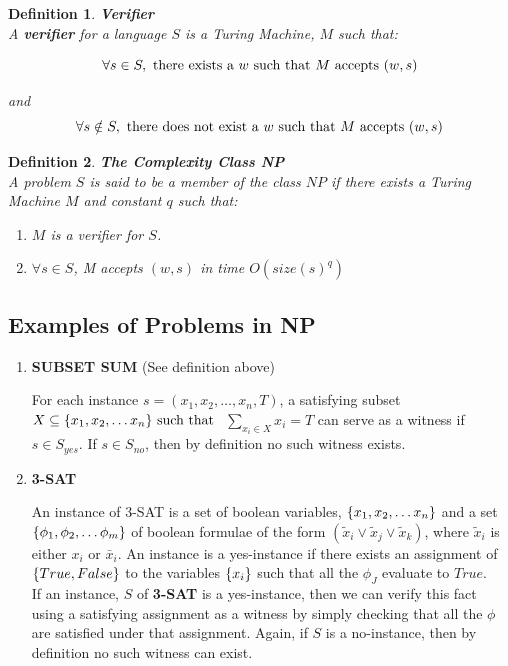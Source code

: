 \documentclass{article}
\newtheorem{definition}{Definition}[section]
\renewcommand{\suchthat}[0]{\textnormal{ such that }}
\begin{document}
\begin{definition}{\textbf{Verifier}}\\

  A \textbf{verifier} for a language $S$ is a Turing Machine, $M$ such that:

  $$\forall s \in S, \text{ there exists a } w \suchthat M \text{ accepts } (w, s)$$ 

  and
  $$\forall s \notin S, \text{ there does not exist a } w \suchthat M \text{ accepts } (w, s)$$
  
\end{definition}
\begin{definition}{\textbf{The Complexity Class NP}}\\
  
  A problem $S$ is said to be a member of the class $NP$ if there
  exists a Turing Machine $M$ and constant $q$ such that:

  \begin{enumerate}
  \item $M$ is a verifier for $S$.
  \item $\forall s \in S$, M accepts $(w, s)$ in time $O(size(s)^q)$
  \end{enumerate}
  
\end{definition}

\subsection*{Examples of Problems in NP}

\begin{enumerate}
\item \textbf{SUBSET SUM} (See definition above)

  For each instance $s = (x_1, x_2, \ldots, x_n,
  T)$, a satisfying subset $X \subseteq \set{x_1, x_2, \ldots x_n}
  \suchthat$ $\sum\limits_{x_i \in X}x_i = T$ can serve as a witness
  if $s \in S_{yes}$.  If $s \in S_{no}$, then by definition no
  such witness exists.

\item \textbf{3-SAT}

  An instance of 3-SAT is a set of boolean variables, $\{x_1,
    x_2, \ldots x_n\}$ and a set $\{\phi_1, \phi_2, \ldots
    \phi_m\}$ of boolean formulae of the form $(\tilde{x}_i \vee \tilde{x}_j \vee
  \tilde{x}_k)$, where $\tilde{x}_i$ is either $x_i$ or $\bar x_i$.  An instance
  is a yes-instance if there exists an assignment of $\{True, False\}$
  to the variables $\{x_i\}$ such that all the $\phi_J$ evaluate to 
  $True$.\\

  If an instance, $S$ of \textbf{3-SAT} is a yes-instance, then we
  can verify this fact using a satisfying assignment as a witness
  by simply checking that all the $\phi$ are satisfied under that
  assignment.  Again, if $S$ is a no-instance, then by definition
  no such witness can exist.

\end{enumerate}
\end{document}
